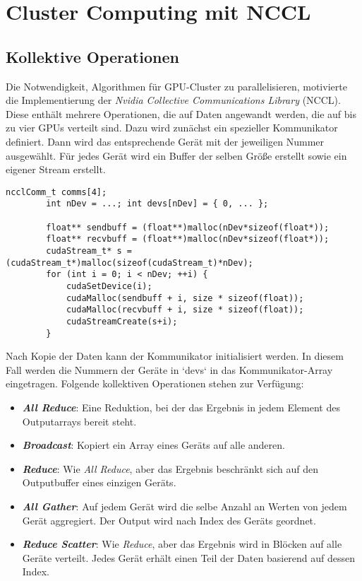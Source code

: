 	\section{Cluster Computing mit NCCL}
		\subsection{Kollektive Operationen}
		Die Notwendigkeit, Algorithmen für GPU-Cluster zu parallelisieren, motivierte die Implementierung der \textit{Nvidia Collective Communications Library} (NCCL). Diese enthält mehrere Operationen, die auf Daten angewandt werden, die auf bis zu vier GPUs verteilt sind. Dazu wird zunächst ein spezieller Kommunikator definiert. Dann wird das entsprechende Gerät mit der jeweiligen Nummer ausgewählt. Für jedes Gerät wird ein Buffer der selben Größe erstellt sowie ein eigener Stream erstellt.
	
		\begin{lstlisting}[caption=NCCL: Buffer und Streams]
		ncclComm_t comms[4];
		int nDev = ...; int devs[nDev] = { 0, ... };

		float** sendbuff = (float**)malloc(nDev*sizeof(float*));
		float** recvbuff = (float**)malloc(nDev*sizeof(float*));
		cudaStream_t* s = (cudaStream_t*)malloc(sizeof(cudaStream_t)*nDev);
		for (int i = 0; i < nDev; ++i) {
			cudaSetDevice(i);
			cudaMalloc(sendbuff + i, size * sizeof(float));
			cudaMalloc(recvbuff + i, size * sizeof(float));
			cudaStreamCreate(s+i);
		}
		\end{lstlisting}
	
		Nach Kopie der Daten kann der Kommunikator initialisiert werden. In diesem Fall werden die Nummern der Geräte in \li`devs` in das Kommunikator-Array eingetragen. Folgende kollektiven Operationen stehen zur Verfügung:
	
		\begin{itemize}
		\item \textbf{\textit{All Reduce}}: Eine Reduktion, bei der das Ergebnis in jedem Element des Outputarrays bereit steht.
	
		\item \textbf{\textit{Broadcast}}: Kopiert ein Array eines Geräts auf alle anderen.
	
		\item \textbf{\textit{Reduce}}: Wie \textit{All Reduce}, aber das Ergebnis beschränkt sich auf den Outputbuffer eines einzigen Geräts.
	
		\item \textbf{\textit{All Gather}}: Auf jedem Gerät wird die selbe Anzahl an Werten von jedem Gerät aggregiert. Der Output wird nach Index des Geräts geordnet.
	
		\item \textbf{\textit{Reduce Scatter}}: Wie \textit{Reduce}, aber das Ergebnis wird in Blöcken auf alle Geräte verteilt. Jedes Gerät erhält einen Teil der Daten basierend auf dessen Index.
		\end{itemize}
	

